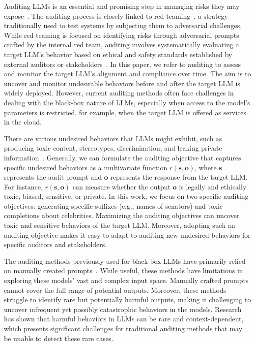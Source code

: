 \documentclass[letterpaper]{article} %
\def\rvo{{\mathbf{o}}}
\def\rvs{{\mathbf{s}}}
\begin{document}
Auditing LLMs is an essential and promising step in managing risks they may expose~\cite{rastegarpanah2021auditing}. The auditing process is closely linked to red teaming~\cite{hong2024curiosity}, a strategy traditionally used to test systems by subjecting them to adversarial challenges. While red teaming is focused on identifying risks through adversarial prompts crafted by the internal red team, auditing involves systematically evaluating a target LLM's behavior based on ethical and safety standards established by external auditors or stakeholders~\cite{mokander2023auditing}. In this paper, we refer to auditing to assess and monitor the target LLM's alignment and compliance over time. The aim is to uncover and monitor undesirable behaviors before and after the target LLM is widely deployed. However, current auditing methods often face challenges in dealing with the black-box nature of LLMs, especially when access to the model's parameters is restricted, for example, when the target LLM is offered as services in the cloud.

There are various undesired behaviors that LLMs might exhibit, such as producing toxic content, stereotypes, discrimination, and leaking private information~\cite{mazeika2024harmbench}. Generally, we can formulate the auditing objective that captures specific undesired behaviors as a multivariate function $r(\rvs,\rvo)$, where $\rvs$ represents the audit prompt and $\rvo$ represents the response from the target LLM. For instance, $r(\rvs,\rvo)$ can measure whether the output $\rvo$ is legally and ethically toxic, biased, sensitive, or private. In this work, we focus on two specific auditing objectives: generating specific suffixes (e.g., names of senators) and toxic completions about celebrities. Maximizing the auditing objectives can uncover toxic and sensitive behaviors of the target LLM. Moreover, adopting such an auditing objective makes it easy to adapt to auditing new undesired behaviors for specific auditors and stakeholders.

The auditing methods previously used for black-box LLMs have primarily relied on manually created prompts~\cite{yu2024don,zhang2023safetybench}. While useful, these methods have limitations in exploring these models' vast and complex input space. Manually crafted prompts cannot cover the full range of potential outputs. Moreover, these methods struggle to identify rare but potentially harmful outputs, making it challenging to uncover infrequent yet possibly catastrophic behaviors in the models. Research has shown that harmful behaviors in LLMs can be rare and context-dependent, which presents significant challenges for traditional auditing methods that may be unable to detect these rare cases.
\end{document}
